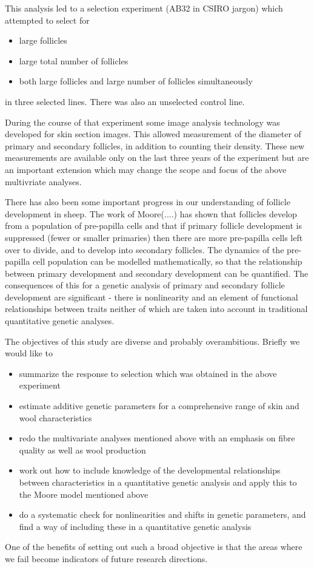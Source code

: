 \documentclass[titlepage]{article}  %
\begin{document}
	This analysis led to a selection experiment (AB32 in CSIRO jargon) which attempted to select for
\begin{itemize}
\item large follicles
\item large total number of follicles
\item both large follicles and large number of follicles simultaneously
\end{itemize}
in three selected lines. There was also an unselected control line.

During the course of that experiment some image analysis technology was developed for skin section images. This allowed measurement of the diameter of primary and secondary follicles, in addition to counting their density. These new measurements are available only on the last three years of the experiment but are an important extension which may change the scope and focus of the above multivriate analyses.

There has also been some important progress in our understanding of follicle development in sheep. The work of Moore(....) has shown that follicles develop from a population of pre-papilla cells and that if primary follicle development is suppressed (fewer or smaller primaries) then there are more pre-papilla cells left over to divide, and to develop into secondary follicles. The dynamics of the pre-papilla cell population can be modelled mathematically, so that the relationship between primary development and secondary development can be quantified. The consequences of this for a genetic analysis of primary and secondary follicle development are significant - there is nonlinearity and an element of functional relationships between traits neither of which are taken into account in traditional quantitative genetic analyses.

The objectives of this study  are diverse and probably overambitious. Briefly we would like to
\begin{itemize}
\item summarize the response to selection which was obtained in the above experiment
\item estimate additive genetic parameters for a comprehensive range of skin and wool characteristics
\item redo the multivariate analyses mentioned above with an emphasis on fibre quality as well as wool production
\item work out how to include knowledge of the developmental relationships between characteristics in a quantitative genetic analysis and apply this to the Moore model mentioned above
\item do a systematic check for nonlinearities and shifts in genetic parameters, and find a way of including these in a quantitative genetic analysis
\end{itemize}
One of the benefits of setting out such a broad objective is that the areas where we fail become indicators of future research directions.
\end{document}
